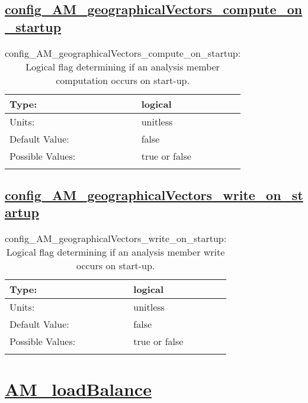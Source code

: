 \subsection[config\_AM\_geographicalVectors\_compute\_on\_startup]{\hyperref[sec:nm_tab_AM_geographicalVectors]{config\_AM\_geographicalVectors\_compute\_on\_startup}}
\label{subsec:nm_sec_config_AM_geographicalVectors_compute_on_startup}
\begin{center}
\begin{longtable}{| p{2.0in} || p{4.0in} |}
    \hline
    Type: & logical \\
    \hline
    Units: & \si{unitless} \\
    \hline
    Default Value: & false \\
    \hline
    Possible Values: & true or false \\
    \hline
    \caption{config\_AM\_geographicalVectors\_compute\_on\_startup: Logical flag determining if an analysis member computation occurs on start-up.}
\end{longtable}
\end{center}
\subsection[config\_AM\_geographicalVectors\_write\_on\_startup]{\hyperref[sec:nm_tab_AM_geographicalVectors]{config\_AM\_geographicalVectors\_write\_on\_startup}}
\label{subsec:nm_sec_config_AM_geographicalVectors_write_on_startup}
\begin{center}
\begin{longtable}{| p{2.0in} || p{4.0in} |}
    \hline
    Type: & logical \\
    \hline
    Units: & \si{unitless} \\
    \hline
    Default Value: & false \\
    \hline
    Possible Values: & true or false \\
    \hline
    \caption{config\_AM\_geographicalVectors\_write\_on\_startup: Logical flag determining if an analysis member write occurs on start-up.}
\end{longtable}
\end{center}
\section[AM\_loadBalance]{\hyperref[sec:nm_tab_AM_loadBalance]{AM\_loadBalance}}
\label{sec:nm_sec_AM_loadBalance}
